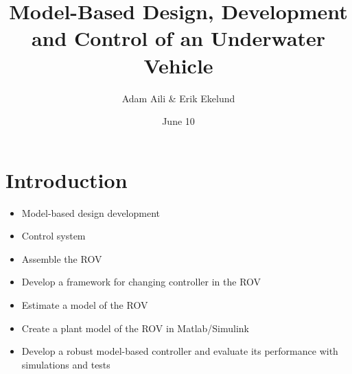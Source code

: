 \documentclass[11pt,aspectratio=169]{beamer}
\author{Adam Aili \& Erik Ekelund}
\title{Model-Based Design, Development and Control of an Underwater Vehicle}
\date{June 10}
\begin{document}
\begin{frame}
\titlepage
\end{frame}
\section{Introduction}
\begin{frame}
\begin{itemize}
\item Model-based design development
\item Control system
\end{itemize}
\end{frame}

\begin{frame}
\begin{itemize}
\item Assemble the ROV
\item Develop a framework for changing controller in the ROV
\item Estimate a model of the ROV
\item Create a plant model of the ROV in Matlab/Simulink
\item Develop a robust model-based controller and evaluate its performance with simulations and tests
\end{itemize}
\end{frame}


\end{document}

